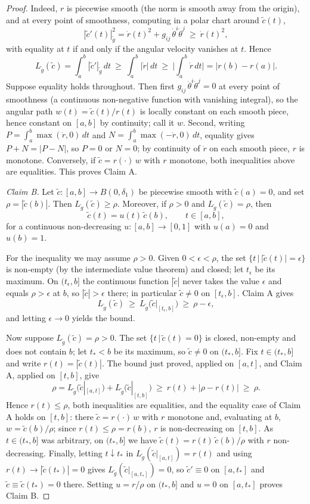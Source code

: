 \begin{proof}
Indeed, $r$ is piecewise smooth (the norm is smooth away from the
origin), and at every point of smoothness, computing in a polar
chart around $\tilde c(t)$,
$$|\tilde c'(t)|_{\tilde g}^2=\dot r(t)^2
+g_{ij}\,\dot\theta^i\dot\theta^j\ \ge\ \dot r(t)^2,$$
with equality at $t$ if and only if the angular velocity vanishes
at $t$. Hence
$$L_{\tilde g}(\tilde c)=\int_a^b|\tilde c'|_{\tilde g}\,dt
\ \ge\ \int_a^b|\dot r|\,dt\ \ge\
\Big|\int_a^b\dot r\,dt\Big|=|r(b)-r(a)|.$$
Suppose equality holds throughout. Then first
$g_{ij}\,\dot\theta^i\dot\theta^j=0$ at every point of smoothness
(a continuous non-negative function with vanishing integral), so
the angular path $w(t)=\tilde c(t)/r(t)$ is locally constant on
each smooth piece, hence constant on $[a,b]$ by continuity; call
it $w$. Second, writing $P=\int_a^b\max(\dot r,0)\,dt$ and
$N=\int_a^b\max(-\dot r,0)\,dt$, equality gives $P+N=|P-N|$, so
$P=0$ or $N=0$; by continuity of $\dot r$ on each smooth piece,
$r$ is monotone. Conversely, if $\tilde c=r(\cdot)\,w$ with $r$
monotone, both inequalities above are equalities. This proves
Claim A.

\emph{Claim B.} Let $\tilde c\colon[a,b]\to B(0,\delta_1)$ be
piecewise smooth with $\tilde c(a)=0$, and set
$\rho=|\tilde c(b)|$. Then $L_{\tilde g}(\tilde c)\ge\rho$.
Moreover, if $\rho>0$ and $L_{\tilde g}(\tilde c)=\rho$, then
$$\tilde c(t)=u(t)\,\tilde c(b),\qquad t\in[a,b],$$
for a continuous non-decreasing $u\colon[a,b]\to[0,1]$ with
$u(a)=0$ and $u(b)=1$.

For the inequality we may assume $\rho>0$. Given
$0<\epsilon<\rho$, the set $\{t\,|\,|\tilde c(t)|=\epsilon\}$ is
non-empty (by the intermediate value theorem) and closed; let
$t_\epsilon$ be its maximum. On $(t_\epsilon,b]$ the continuous
function $|\tilde c|$ never takes the value $\epsilon$ and equals
$\rho>\epsilon$ at $b$, so $|\tilde c|>\epsilon$ there; in
particular $\tilde c\ne0$ on $[t_\epsilon,b]$. Claim A gives
$$L_{\tilde g}(\tilde c)\ \ge\
L_{\tilde g}\big(\tilde c|_{[t_\epsilon,b]}\big)\ \ge\
\rho-\epsilon,$$
and letting $\epsilon\to0$ yields the bound.

Now suppose $L_{\tilde g}(\tilde c)=\rho>0$. The set
$\{t\,|\,\tilde c(t)=0\}$ is closed, non-empty and does not
contain $b$; let $t_*<b$ be its maximum, so $\tilde c\ne0$ on
$(t_*,b]$. Fix $t\in(t_*,b]$ and write $r(t)=|\tilde c(t)|$. The
bound just proved, applied on $[a,t]$, and Claim A, applied on
$[t,b]$, give
$$\rho=L_{\tilde g}\big(\tilde c|_{[a,t]}\big)
+L_{\tilde g}\big(\tilde c|_{[t,b]}\big)\ \ge\
r(t)+|\rho-r(t)|\ \ge\ \rho.$$
Hence $r(t)\le\rho$, both inequalities are equalities, and the
equality case of Claim A holds on $[t,b]$: there $\tilde
c=r(\cdot)\,w$ with $r$ monotone and, evaluating at $b$,
$w=\tilde c(b)/\rho$; since $r(t)\le\rho=r(b)$, $r$ is
non-decreasing on $[t,b]$. As $t\in(t_*,b]$ was arbitrary, on
$(t_*,b]$ we have $\tilde c(t)=r(t)\,\tilde c(b)/\rho$ with $r$
non-decreasing. Finally, letting $t\downarrow t_*$ in
$L_{\tilde g}(\tilde c|_{[a,t]})=r(t)$ and using
$r(t)\to|\tilde c(t_*)|=0$ gives
$L_{\tilde g}(\tilde c|_{[a,t_*]})=0$, so $\tilde c'\equiv0$ on
$[a,t_*]$ and $\tilde c\equiv\tilde c(t_*)=0$ there. Setting
$u=r/\rho$ on $(t_*,b]$ and $u=0$ on $[a,t_*]$ proves Claim B.


\end{proof}
